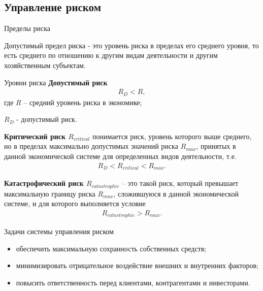 \documentclass[_fin_decisions_lectures.tex]{subfiles}
\begin{document}
\subsection{Управление риском}
\begin{frame}{Пределы риска}
\begin{block}{Допустимый предел риска}
- это уровень риска в пределах его среднего уровня, то есть среднего по отношению к другим видам деятельности и другим хозяйственным субъектам. 
\end{block}
\end{frame}

\begin{frame}[allowframebreaks]{Уровни риска}
\textbf{Допустимый риск}
\begin{align}
R_D<R,
\end{align}
где $R$ – средний уровень риска в экономике;

$R_D$ - допустимый риск.

\pagebreak
\textbf{Критический риск $R_{critical}$ }понимается риск, уровень которого выше среднего, но в пределах максимально допустимых значений риска $R_{max}$, принятых в данной экономической системе для определенных видов деятельности, т.е.
\begin{align}
R_D<R_{critical}<R_{max}.
\end{align}

\pagebreak
\textbf{Катастрофический риск $R_{catastrophic}$} – это такой риск, который превышает максимальную границу риска $R_{max}$, сложившуюся в данной экономической системе, и для которого выполняется условие
\begin{align}
R_{catastrophic}>R_{max}.
\end{align} 

\end{frame}

\begin{frame}{Задачи системы управления риском}
\begin{itemize}[<+->]
\item обеспечить максимальную сохранность собственных средств; 
\item
минимизировать отрицательное воздействие внешних и внутренних факторов;
\item
повысить ответственность перед клиентами, контрагентами и инвесторами.
\end{itemize}
\end{frame}
\end{document}
